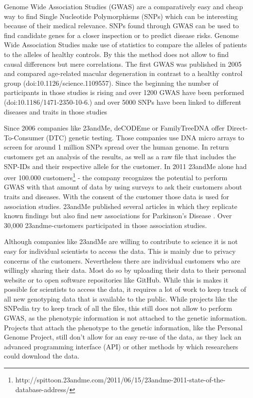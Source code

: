 \documentclass[10pt]{article}
\begin{document}
Genome Wide Association Studies (GWAS) are a comparatively easy and cheap way to find Single Nucleotide Polymorphisms (SNPs) which can be interesting because of their medical relevance. SNPs found through GWAS can be used to find candidate genes for a closer inspection or to predict disease risks. Genome Wide Association Studies make use of statistics to compare the alleles of patients to the alleles of healthy controls. By this the method does not allow to find causal differences but mere correlations. The first GWAS was published in 2005 and compared age-related macular degeneration in contrast to a healthy control group (doi:10.1126/science.1109557). Since the beginning the number of participants in those studies is rising and over 1200 GWAS have been performed (doi:10.1186/1471-2350-10-6.) and over 5000 SNPs have been linked to different diseases and traits in those studies %

Since 2006 companies like 23andMe, deCODEme or FamilyTreeDNA offer Direct-To-Consumer (DTC) genetic testing. Those companies use DNA micro arrays to screen for around 1 million SNPs spread over the human genome. In return customers get an analysis of the results, as well as a raw file that includes the SNP-IDs and their respective allele for the customer. In 2011 23andMe alone had over 100.000 customers\footnote{http://spittoon.23andme.com/2011/06/15/23andme-2011-state-of-the-database-address/} - the company recognizes the potential to perform GWAS with that amount of data by using surveys to ask their customers about traits and diseases. With the consent of the customer those data is used for association studies. 23andMe published several articles in which they replicate known findings but also find new associations for Parkinson's Disease \cite{Eriksson2010, Do2011}. Over 30,000 23andme-customers participated in those association studies.  

Although companies like 23andMe are willing to contribute to science it is not easy for individual scientists to access the data. This is mainly due to privacy concerns of the customers. Nevertheless there are individual customers who are willingly sharing their data. Most do so by uploading their data to their personal website or to open software repositories like GitHub. While this is makes it possible for scientists to access the data, it requires a lot of work to keep track of all new genotyping data that is available to the public. While projects like the SNPedia try to keep track of all the files, this still does not allow to perform GWAS, as the phenotypic information is not attached to the genetic information. Projects that attach the phenotype to the genetic information, like the Personal Genome Project, still don't allow for an easy re-use of the data, as they lack an advanced programming interface (API) or other methods by which researchers could download the data.  
\end{document}
